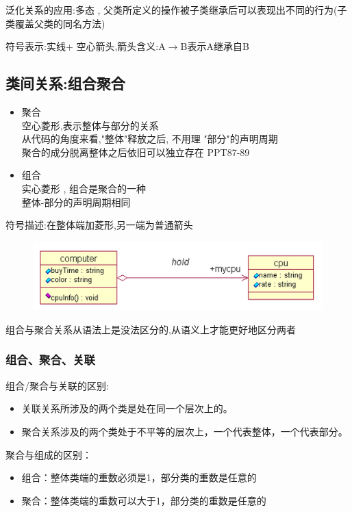 \documentclass[UTF8,a4paper]{ctexart}
\begin{document}
泛化关系的应用:多态 , 父类所定义的操作被子类继承后可以表现出不同的行为(子类覆盖父类的同名方法)

符号表示:实线+ 空心箭头,箭头含义:A$\to$B表示A继承自B

\subsection{类间关系:组合聚合}
\begin{itemize}
  \item 聚合\\
  空心菱形,表示整体与部分的关系\\
  从代码的角度来看,"整体"释放之后, 不用理 "部分"的声明周期\\
  聚合的成分脱离整体之后依旧可以独立存在 PPT87-89
  \item 组合\\
  实心菱形 , 组合是聚合的一种\\
  整体-部分的声明周期相同
\end{itemize}

符号描述:在整体端加菱形,另一端为普通箭头
\begin{figure}[H]
  \centering
  \includegraphics[scale = 0.3]{assets/SoftwareEngineering_cbbbe.png}
\end{figure}

组合与聚合关系从语法上是没法区分的,从语义上才能更好地区分两者

\subsubsection{组合、聚合、关联}

组合/聚合与关联的区别:
\begin{itemize}
  \item 关联关系所涉及的两个类是处在同一个层次上的。
  \item 聚合关系涉及的两个类处于不平等的层次上，一个代表整体，一个代表部分。
\end{itemize}

聚合与组成的区别：
\begin{itemize}
  \item 组合：整体类端的重数必须是1，部分类的重数是任意的
  \item 聚合：整体类端的重数可以大于1，部分类的重数是任意的
\end{itemize}
\end{document}
